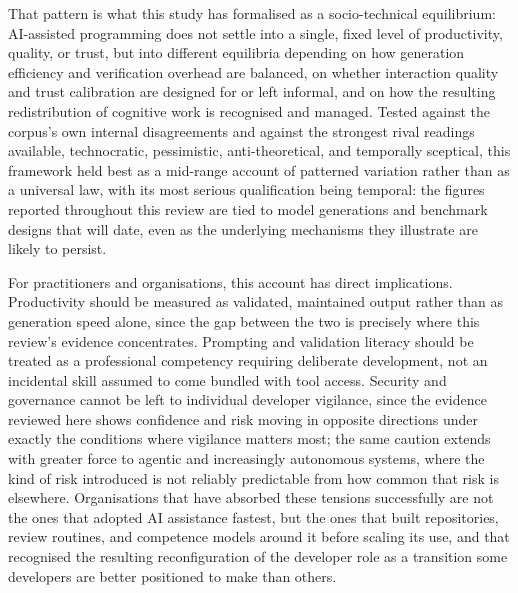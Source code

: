 That pattern is what this study has formalised as a socio-technical equilibrium: AI-assisted programming does not settle into a single, fixed level of productivity, quality, or trust, but into different equilibria depending on how generation efficiency and verification overhead are balanced, on whether interaction quality and trust calibration are designed for or left informal, and on how the resulting redistribution of cognitive work is recognised and managed. Tested against the corpus's own internal disagreements and against the strongest rival readings available, technocratic, pessimistic, anti-theoretical, and temporally sceptical, this framework held best as a mid-range account of patterned variation rather than as a universal law, with its most serious qualification being temporal: the figures reported throughout this review are tied to model generations and benchmark designs that will date, even as the underlying mechanisms they illustrate are likely to persist.

For practitioners and organisations, this account has direct implications. Productivity should be measured as validated, maintained output rather than as generation speed alone, since the gap between the two is precisely where this review's evidence concentrates. Prompting and validation literacy should be treated as a professional competency requiring deliberate development, not an incidental skill assumed to come bundled with tool access. Security and governance cannot be left to individual developer vigilance, since the evidence reviewed here shows confidence and risk moving in opposite directions under exactly the conditions where vigilance matters most; the same caution extends with greater force to agentic and increasingly autonomous systems, where the kind of risk introduced is not reliably predictable from how common that risk is elsewhere. Organisations that have absorbed these tensions successfully are not the ones that adopted AI assistance fastest, but the ones that built repositories, review routines, and competence models around it before scaling its use, and that recognised the resulting reconfiguration of the developer role as a transition some developers are better positioned to make than others.

